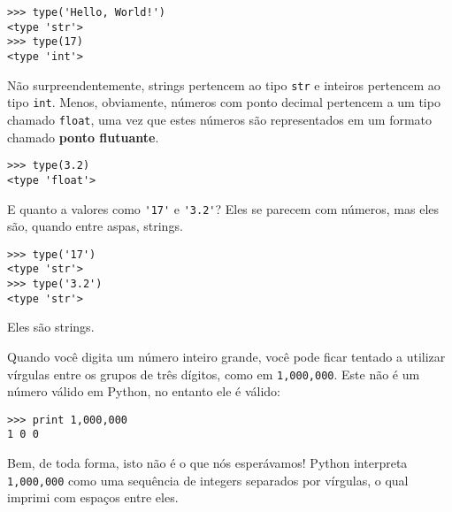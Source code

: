 \beforeverb
\begin{verbatim}
>>> type('Hello, World!')
<type 'str'>
>>> type(17)
<type 'int'>
\end{verbatim}
\afterverb
% 

Não surpreendentemente, strings pertencem ao tipo {\tt str} e 
inteiros pertencem ao tipo {\tt int}. Menos, obviamente, números 
com ponto decimal pertencem a um tipo chamado {\tt float},
uma vez que estes números são representados em um formato 
chamado {\bf ponto flutuante}.


\beforeverb
\begin{verbatim}
>>> type(3.2)
<type 'float'>
\end{verbatim}
\afterverb

E quanto a valores como \verb"'17'" e \verb"'3.2'"?
Eles se parecem com números, mas eles são, quando entre aspas, 
strings.


\beforeverb
\begin{verbatim}
>>> type('17')
<type 'str'>
>>> type('3.2')
<type 'str'>
\end{verbatim}
\afterverb
%

Eles são strings.

Quando você digita um número inteiro grande, você pode ficar tentado a utilizar vírgulas 
entre os grupos de três dígitos, como em {\tt 1,000,000}. Este não é um 
número válido em Python, no entanto ele é válido:

\beforeverb
\begin{verbatim}
>>> print 1,000,000
1 0 0
\end{verbatim}
\afterverb
%

Bem, de toda forma, isto não é o que nós esperávamos!  Python interpreta {\tt
  1,000,000} como  uma sequência de integers separados por vírgulas, o qual 
imprimi com espaços entre eles.

